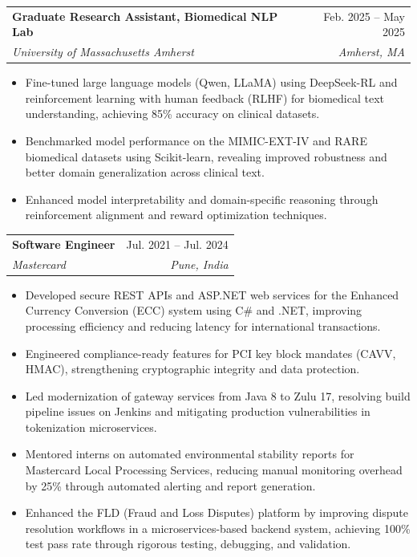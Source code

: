 \documentclass[letterpaper,11pt]{article}
\makeatletter
\newcommand{\resumeItem}[1]{
  \item\small{
    {#1 \vspace{-2pt}}
  }
}
\newcommand{\resumeSubheading}[4]{
  \vspace{-2pt}\item
    \begin{tabular*}{0.97\textwidth}[t]{l@{\extracolsep{\fill}}r}
      \textbf{#1} & #2 \\
      \textit{\small#3} & \textit{\small #4} \\
    \end{tabular*}\vspace{-7pt}
}
\newcommand{\resumeItemListStart}{\begin{itemize}[noitemsep, topsep=0pt, parsep=0pt]}
\newcommand{\resumeItemListEnd}{\end{itemize}\vspace{-5pt}}
\makeatother
\begin{document}
  \resumeSubheading
    {Graduate Research Assistant, Biomedical NLP Lab}{Feb. 2025 -- May 2025}
    {University of Massachusetts Amherst}{Amherst, MA}
    \resumeItemListStart
      \resumeItem{Fine-tuned large language models (Qwen, LLaMA) using DeepSeek-RL and reinforcement learning with human feedback (RLHF) for biomedical text understanding, achieving 85\% accuracy on clinical datasets.}
      \resumeItem{Benchmarked model performance on the MIMIC-EXT-IV and RARE biomedical datasets using Scikit-learn, revealing improved robustness and better domain generalization across clinical text.}
      \resumeItem{Enhanced model interpretability and domain-specific reasoning through reinforcement alignment and reward optimization techniques.}
    \resumeItemListEnd


  \resumeSubheading
    {Software Engineer}{Jul. 2021 -- Jul. 2024}
    {Mastercard}{Pune, India}
    \resumeItemListStart
      \resumeItem{Developed secure REST APIs and ASP.NET web services for the Enhanced Currency Conversion (ECC) system using C\# and .NET, improving processing efficiency and reducing latency for international transactions.}
      \resumeItem{Engineered compliance-ready features for PCI key block mandates (CAVV, HMAC), strengthening cryptographic integrity and data protection.}
      \resumeItem{Led modernization of gateway services from Java 8 to Zulu 17, resolving build pipeline issues on Jenkins and mitigating production vulnerabilities in tokenization microservices.}
      \resumeItem{Mentored interns on automated environmental stability reports for Mastercard Local Processing Services, reducing manual monitoring overhead by 25\% through automated alerting and report generation.}
      \resumeItem{Enhanced the FLD (Fraud and Loss Disputes) platform by improving dispute resolution workflows in a microservices-based backend system, achieving 100\% test pass rate through rigorous testing, debugging, and validation.}
    \resumeItemListEnd
\end{document}

